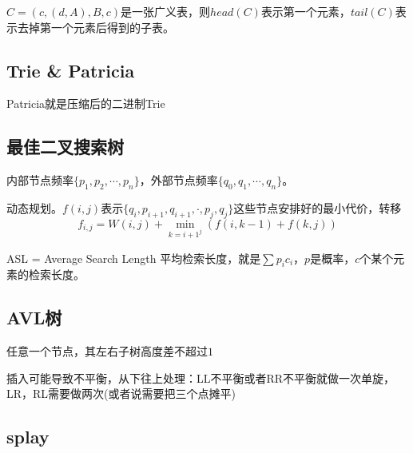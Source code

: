 \documentclass[8pt]{article}
\begin{document}
$C = (c, (d, A), B, c)$是一张广义表，则$head(C)$表示第一个元素，$tail(C)$表示去掉第一个元素后得到的子表。

\subsection{Trie \& Patricia}

Patricia就是压缩后的二进制Trie

\subsection{最佳二叉搜索树}

内部节点频率$\{p_1, p_2, \cdots, p_n\}$，外部节点频率$\{q_0, q_1, \cdots, q_n\}$。

动态规划。$f(i, j)$表示$\{q_i, p_{i+1}, q_{i+1}, \cdot, p_j, q_j\}$这些节点安排好的最小代价，转移$$f_{i,j} = W(i, j) + \min_{k=i+1^{j}}(f(i, k - 1) + f(k, j))$$

ASL = Average Search Length 平均检索长度，就是$\sum p_i c_i$，$p$是概率，$c$个某个元素的检索长度。

\subsection{AVL树}

任意一个节点，其左右子树高度差不超过$1$

插入可能导致不平衡，从下往上处理：LL不平衡或者RR不平衡就做一次单旋，LR，RL需要做两次(或者说需要把三个点摊平)

\subsection{splay}
\end{document}
